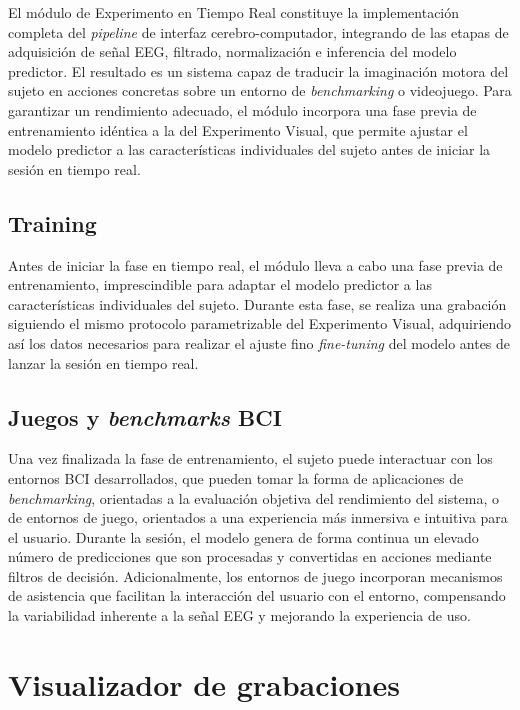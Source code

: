 El módulo de Experimento en Tiempo Real constituye la implementación completa del \textit{pipeline} de interfaz cerebro-computador, integrando de las etapas de adquisición de señal EEG, filtrado, normalización e inferencia del modelo predictor. El resultado es un sistema capaz de traducir la imaginación motora del sujeto en acciones concretas sobre un entorno de \textit{benchmarking} o videojuego. Para garantizar un rendimiento adecuado, el módulo incorpora una fase previa de entrenamiento idéntica a la del Experimento Visual, que permite ajustar el modelo predictor a las características individuales del sujeto antes de iniciar la sesión en tiempo real.

\subsection{Training}
\label{subsec:training}

Antes de iniciar la fase en tiempo real, el módulo lleva a cabo una fase previa de entrenamiento, imprescindible para adaptar el modelo predictor a las características individuales del sujeto. Durante esta fase, se realiza una grabación siguiendo el mismo protocolo parametrizable del Experimento Visual, adquiriendo así los datos necesarios para realizar el ajuste fino \textit{fine-tuning} del modelo antes de lanzar la sesión en tiempo real.

\subsection{Juegos y \textit{benchmarks} BCI}
\label{subsec:juegosBCI}

Una vez finalizada la fase de entrenamiento, el sujeto puede interactuar con los entornos BCI desarrollados, que pueden tomar la forma de aplicaciones de \textit{benchmarking}, orientadas a la evaluación objetiva del rendimiento del sistema, o de entornos de juego, orientados a una experiencia más inmersiva e intuitiva para el usuario. Durante la sesión, el modelo genera de forma continua un elevado número de predicciones que son procesadas y convertidas en acciones mediante filtros de decisión. Adicionalmente, los entornos de juego incorporan mecanismos de asistencia que facilitan la interacción del usuario con el entorno, compensando la variabilidad inherente a la señal EEG y mejorando la experiencia de uso.

\section{Visualizador de grabaciones}
\label{sec:visualizadorGrabaciones}

